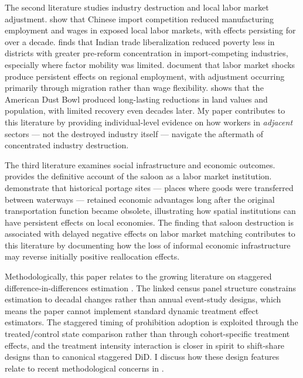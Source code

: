 \documentclass[12pt]{article}
\begin{document}
The second literature studies industry destruction and local labor market adjustment. \citet{autor2003} show that Chinese import competition reduced manufacturing employment and wages in exposed local labor markets, with effects persisting for over a decade. \citet{topalova2010} finds that Indian trade liberalization reduced poverty less in districts with greater pre-reform concentration in import-competing industries, especially where factor mobility was limited. \citet{blanchard1992} document that labor market shocks produce persistent effects on regional employment, with adjustment occurring primarily through migration rather than wage flexibility. \citet{hornbeck2012} shows that the American Dust Bowl produced long-lasting reductions in land values and population, with limited recovery even decades later. My paper contributes to this literature by providing individual-level evidence on how workers in \emph{adjacent} sectors --- not the destroyed industry itself --- navigate the aftermath of concentrated industry destruction.

The third literature examines social infrastructure and economic outcomes. \citet{powers1998} provides the definitive account of the saloon as a labor market institution. \citet{bleakley2014} demonstrate that historical portage sites --- places where goods were transferred between waterways --- retained economic advantages long after the original transportation function became obsolete, illustrating how spatial institutions can have persistent effects on local economies. The finding that saloon destruction is associated with delayed negative effects on labor market matching contributes to this literature by documenting how the loss of informal economic infrastructure may reverse initially positive reallocation effects.

Methodologically, this paper relates to the growing literature on staggered difference-in-differences estimation \citep{goodmanbacon2021, callawaysantanna2021, sunabraham2021}. The linked census panel structure constrains estimation to decadal changes rather than annual event-study designs, which means the paper cannot implement standard dynamic treatment effect estimators. The staggered timing of prohibition adoption is exploited through the treated/control state comparison rather than through cohort-specific treatment effects, and the treatment intensity interaction is closer in spirit to shift-share designs than to canonical staggered DiD. I discuss how these design features relate to recent methodological concerns in .
\end{document}
